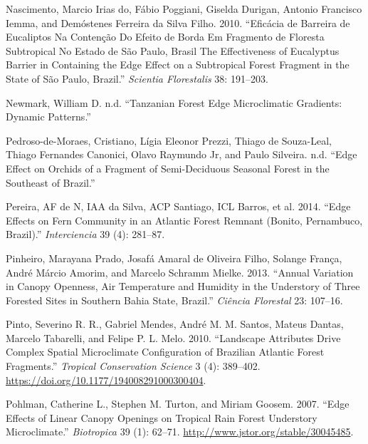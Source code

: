 \documentclass[
  12pt,
]{article}
\newlength{\cslhangindent}
\newenvironment{CSLReferences}[2] %
 {\begin{list}{}{%
  \setlength{\itemindent}{0pt}
  \setlength{\leftmargin}{0pt}
  \setlength{\parsep}{0pt}
  \ifodd #1
   \setlength{\leftmargin}{\cslhangindent}
   \setlength{\itemindent}{-1\cslhangindent}
  \fi
  \setlength{\itemsep}{#2\baselineskip}}}
 {\end{list}}
\begin{document}
\begin{CSLReferences}{1}{0}
Nascimento, Marcio Irias do, Fábio Poggiani, Giselda Durigan, Antonio
Francisco Iemma, and Demóstenes Ferreira da Silva Filho. 2010.
{``Eficácia de Barreira de Eucaliptos Na Contenção Do Efeito de Borda Em
Fragmento de Floresta Subtropical No Estado de {São} {Paulo}, {Brasil}
{The} Effectiveness of {Eucalyptus} Barrier in Containing the Edge
Effect on a Subtropical Forest Fragment in the State of {São} {Paulo},
{Brazil}.''} \emph{Scientia Florestalis} 38: 191--203.

Newmark, William D. n.d. {``Tanzanian {Forest} {Edge} {Microclimatic}
{Gradients}: {Dynamic} {Patterns}.''}

Pedroso-de-Moraes, Cristiano, Lígia Eleonor Prezzi, Thiago de
Souza-Leal, Thiago Fernandes Canonici, Olavo Raymundo Jr, and Paulo
Silveira. n.d. {``Edge {Effect} on {Orchids} of a {Fragment} of
{Semi}-{Deciduous} {Seasonal} {Forest} in the {Southeast} of
{Brazil}.''}

Pereira, AF de N, IAA da Silva, ACP Santiago, ICL Barros, et al. 2014.
{``Edge Effects on Fern Community in an {Atlantic} {Forest} Remnant
({Bonito}, {Pernambuco}, {Brazil}).''} \emph{Interciencia} 39 (4):
281--87.

Pinheiro, Marayana Prado, Josafá Amaral de Oliveira Filho, Solange
França, André Márcio Amorim, and Marcelo Schramm Mielke. 2013. {``Annual
Variation in Canopy Openness, Air Temperature and Humidity in the
Understory of Three Forested Sites in Southern {Bahia} {State},
{Brazil}.''} \emph{Ciência Florestal} 23: 107--16.

Pinto, Severino R. R., Gabriel Mendes, André M. M. Santos, Mateus
Dantas, Marcelo Tabarelli, and Felipe P. L. Melo. 2010. {``Landscape
{Attributes} {Drive} {Complex} {Spatial} {Microclimate} {Configuration}
of {Brazilian} {Atlantic} {Forest} {Fragments}.''} \emph{Tropical
Conservation Science} 3 (4): 389--402.
\url{https://doi.org/10.1177/194008291000300404}.

Pohlman, Catherine L., Stephen M. Turton, and Miriam Goosem. 2007.
{``Edge {Effects} of {Linear} {Canopy} {Openings} on {Tropical} {Rain}
{Forest} {Understory} {Microclimate}.''} \emph{Biotropica} 39 (1):
62--71. \url{http://www.jstor.org/stable/30045485}.


\end{CSLReferences}
\end{document}
